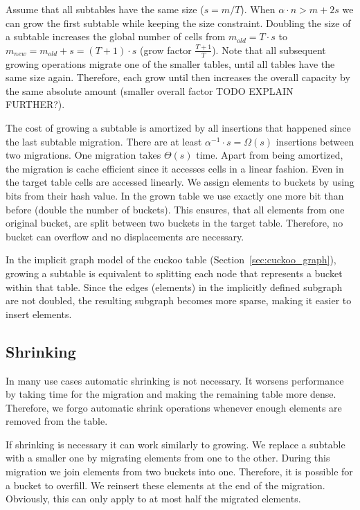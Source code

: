 \documentclass[a4paper,UKenglish]{lipics-v2016}
\begin{document}
Assume that all subtables have the same size ($s=m/T$). When $\alpha\cdot n >
m+2s$ we can grow the first subtable while keeping the size
constraint.  Doubling the size of a subtable increases the global
number of cells from $m_{old} = T\cdot s$ to $m_{new} = m_{old}+s =
(T+1)\cdot s$ (grow factor $\frac{T+1}{T}$).  Note that all subsequent
growing operations migrate one of the smaller tables, until all tables have the
same size again.  Therefore, each grow until then increases the
overall capacity by the same absolute amount (smaller overall factor TODO EXPLAIN FURTHER?).

The cost of growing a subtable is amortized by all insertions that
happened since the last subtable migration.  There are at least
$\alpha^{-1} \cdot s = \Omega(s)$ insertions between two migrations.
One migration takes $\Theta(s)$ time.  Apart from being amortized, the
migration is cache efficient since it accesses cells in a linear
fashion.  Even in the target table cells are accessed linearly.  We
assign elements to buckets by using bits from their hash value. In the
grown table we use exactly one more bit than before (double the number
of buckets).  This ensures, that all elements from one original
bucket, are split between two buckets in the target table.
Therefore, no bucket can overflow and no displacements are necessary.

In the implicit graph model of the cuckoo table
(Section~\ref{sec:cuckoo_graph}), growing a subtable is equivalent to
splitting each node that represents a bucket within that table. Since
the edges (elements) in the implicitly defined subgraph are not
doubled, the resulting subgraph becomes more sparse, making it easier
to insert elements.

\subsection{Shrinking}
In many use cases automatic shrinking is not necessary.  It worsens
performance by taking time for the migration and making the remaining
table more dense.  Therefore, we forgo automatic shrink operations
whenever enough elements are removed from the table.

If shrinking is necessary it can work similarly to growing. We
replace a subtable with a smaller one by migrating elements from one
to the other.  During this migration we join elements from two buckets
into one. Therefore, it is possible for a bucket to overfill.  We
reinsert these elements at the end of the migration.  Obviously, this
can only apply to at most half the migrated elements.
\end{document}

